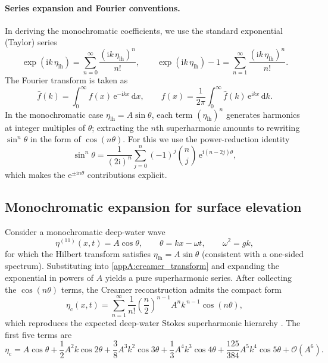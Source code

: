 \documentclass[lineno]{JFM-FLM_Au}
\begin{document}
\begin{appen}
\paragraph{Series expansion and Fourier conventions.}
In deriving the monochromatic coefficients, we use the standard exponential (Taylor) series
\begin{equation}\label{appA:exp_series}
\exp(\mathrm{i}k\,\eta_{\mathrm{lh}})
=\sum_{n=0}^{\infty}\frac{(\mathrm{i}k\,\eta_{\mathrm{lh}})^{n}}{n!},
\qquad
\exp(\mathrm{i}k\,\eta_{\mathrm{lh}})-1
=\sum_{n=1}^{\infty}\frac{(\mathrm{i}k\,\eta_{\mathrm{lh}})^{n}}{n!}.
\end{equation}
The Fourier transform is taken as
\begin{equation}\label{appA:FT_def}
\hat f(k)=\int_{0}^{\infty} f(x)\,\mathrm{e}^{-\mathrm{i}kx}\,\mathrm{d}x,
\qquad
f(x)=\frac{1}{2\pi}\int_{0}^{\infty}\hat f(k)\,\mathrm{e}^{\mathrm{i}kx}\,\mathrm{d}k.
\end{equation}
In the monochromatic case $\eta_{\mathrm{lh}}=A\sin\theta$, each term $(\eta_{\mathrm{lh}})^n$ generates harmonics at integer multiples of $\theta$; extracting the $n$th superharmonic amounts to rewriting $\sin^n\theta$ in the form of $\cos(n\theta)$. For this we use the power-reduction identity
\begin{equation}\label{appA:sin_power_id}
\sin^{n}\theta
=\frac{1}{(2\mathrm{i})^{n}}
\sum_{j=0}^{n}(-1)^{j}\binom{n}{j}\,
\mathrm{e}^{\mathrm{i}(n-2j)\theta},
\end{equation}
which makes the $\mathrm{e}^{\pm \mathrm{i}n\theta}$ contributions explicit.

\subsection{Monochromatic expansion for surface elevation}

Consider a monochromatic deep-water wave
\begin{equation}\label{appA:mono_eta}
\eta^{(11)}(x,t)=A\cos\theta,
\qquad
\theta=kx-\omega t,
\qquad
\omega^2=gk,
\end{equation}
for which the Hilbert transform satisfies $\eta_{\mathrm{lh}}=A\sin\theta$ (consistent with a one-sided spectrum). Substituting into \cref{appA:creamer_transform} and expanding the exponential in powers of $A$ yields a pure superharmonic series. After collecting the $\cos(n\theta)$ terms, the Creamer reconstruction admits the compact form
\begin{equation}\label{appA:eta_series_general}
\eta_{\mathrm{c}}(x,t)
=
\sum_{n=1}^{\infty}
\frac{1}{n!}\left(\frac{n}{2}\right)^{n-1}
A^n k^{\,n-1}\cos(n\theta),
\end{equation}
which reproduces the expected deep-water Stokes superharmonic hierarchy \citep{fenton1985fifth,zhao2022stokes}. The first five terms are
\begin{equation}\label{appA:eta_series_2to5}
\eta_{\mathrm{c}}
=
A\cos\theta
+\frac{1}{2}A^2k\cos 2\theta
+\frac{3}{8}A^3k^2\cos 3\theta
+\frac{1}{3}A^4k^3\cos 4\theta
+\frac{125}{384}A^5k^4\cos 5\theta
+\mathcal{O}(A^6).
\end{equation}


\end{appen}
\end{document}
